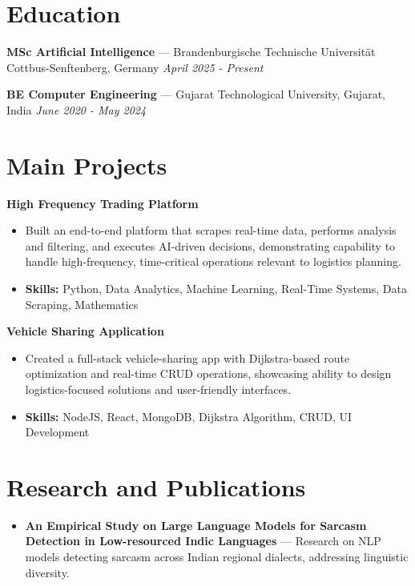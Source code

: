 \documentclass[a4paper,10pt]{article}
\begin{document}
\section*{Education}
\textbf{MSc Artificial Intelligence} — Brandenburgische Technische Universität Cottbus-Senftenberg, Germany \hfill \textit{April 2025 - Present}\par
\vspace{1.5pt}
\textbf{BE Computer Engineering} — Gujarat Technological University, Gujarat, India \hfill \textit{June 2020 - May 2024}\par

\section*{Main Projects}
\textbf{High Frequency Trading Platform}\par
\vspace{1pt}
\begin{itemize}
  \item Built an end-to-end platform that scrapes real-time data, performs analysis and filtering, and executes AI-driven decisions, demonstrating capability to handle high-frequency, time-critical operations relevant to logistics planning.
  \item \textbf{Skills:} Python, Data Analytics, Machine Learning, Real-Time Systems, Data Scraping, Mathematics
\end{itemize}
\vspace{3pt}
\textbf{Vehicle Sharing Application}\par
\vspace{1pt}
\begin{itemize}
  \item Created a full-stack vehicle-sharing app with Dijkstra-based route optimization and real-time CRUD operations, showcasing ability to design logistics-focused solutions and user-friendly interfaces.
  \item \textbf{Skills:} NodeJS, React, MongoDB, Dijkstra Algorithm, CRUD, UI Development
\end{itemize}

\section*{Research and Publications}
\begin{itemize}
\item \textbf{An Empirical Study on Large Language Models for Sarcasm Detection in Low-resourced Indic Languages} — Research on NLP models detecting sarcasm across Indian regional dialects, addressing linguistic diversity.
\end{itemize}
\end{document}
